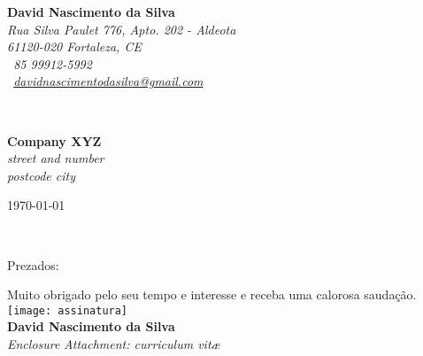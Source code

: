 


\sffamily   %
\hfill%
\begin{minipage}[t]{.6\textwidth}
	\raggedleft%
	{\bfseries David Nascimento da Silva}\\[.35ex]
	\small\itshape%
	Rua Silva Paulet 776, Apto. 202 - Aldeota\\
	61120-020 Fortaleza, CE\\[.35ex]
	\Telefon~85 99912-5992\\
	\Letter~\href{mailto:davidnascimentodasilva@gmail.com}{davidnascimentodasilva@gmail.com}
\end{minipage}\\[1em]
%
\begin{minipage}[t]{.4\textwidth}
	\raggedright%
	{\bfseries Company XYZ}\\[.35ex]
	\small\itshape%
	street and number\\
	postcode city
\end{minipage}
\hfill %
\begin{minipage}[t]{.4\textwidth}
	\raggedleft %
	\today
\end{minipage}\\[2em]
\raggedright
Prezados:\\[1.5em]
%
\kant[1-3] \par

\hfill
%

\raggedleft%
Muito obrigado pelo seu tempo e interesse e receba uma calorosa saudação.\\[1em]
\texttt{[image: assinatura]}\\
{\bfseries David Nascimento da Silva}~~~~~~~~\\
%
\vfill%
{\slshape Enclosure}
{\slshape Attachment: curriculum vit\ae{}}
